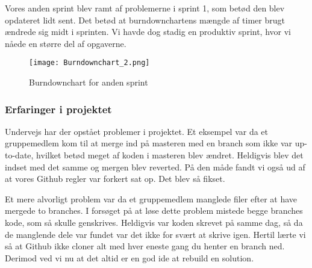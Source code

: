 Vores anden sprint blev ramt af problemerne i sprint 1, som betød den blev opdateret lidt sent. Det betød at burndownchartens mængde af timer brugt ændrede sig midt i sprinten. Vi havde dog stadig en produktiv sprint, hvor vi nåede en større del af opgaverne.

\begin{figure}[h]
    \caption{Burndownchart for anden sprint}
    \centering
        \texttt{[image: Burndownchart\_2.png]}
    \label{burndownsecondsprint}
\end{figure}

\subsubsection{Erfaringer i projektet}

Undervejs har der opstået problemer i projektet. Et eksempel var da et gruppemedlem kom til at merge ind på masteren med en branch som ikke var up-to-date, hvilket betød meget af koden i masteren blev ændret. Heldigvis blev det indset med det samme og mergen blev reverted. På den måde fandt vi også ud af at vores Github regler var forkert sat op. Det blev så fikset.

Et mere alvorligt problem var da et gruppemedlem manglede filer efter at have mergede to branches. I forsøget på at løse dette problem mistede begge branches kode, som så skulle genskrives. Heldigvis var koden skrevet på samme dag, så da de manglende dele var fundet var det ikke for svært at skrive igen. Hertil lærte vi så at Github ikke cloner alt med hver eneste gang du henter en branch ned. Derimod ved vi nu at det altid er en god ide at rebuild en solution.